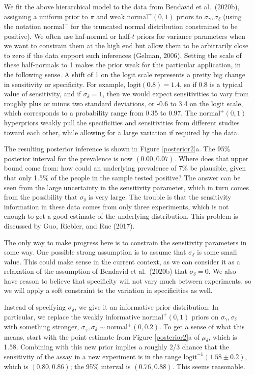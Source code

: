 \documentclass[11pt]{article}
\begin{document}
We fit the above hierarchical model to the data from Bendavid et al.\
(2020b), assigning a uniform prior to $\pi$ and weak
$\mbox{normal}^+(0,1)$ priors to $\sigma_{\gamma},\sigma_{\delta}$
(using the notation $\mbox{normal}^+$ for the truncated normal
distribution constrained to be positive).  We often use haf-normal or
half-$t$ priors for variance parameters when we want to constrain them
at the high end but allow them to be arbitrarily close to zero if the
data support such inferences (Gelman, 2006).  Setting the scale of
these half-normals to 1 makes the prior weak for this particular
application, in the following sense. A shift of 1 on the logit scale
represents a pretty big change in sensitivity or specificity.  For
example, $\mbox{logit}(0.8)=1.4$, so if 0.8 is a typical value of
sensitivity, and if $\sigma_{\delta}=1$, then we would expect
sensitivities to vary from roughly plus or minus two standard
deviations, or -0.6 to 3.4 on the logit scale,
which corresponds to a probability range from 0.35 to 0.97.  The
$\mbox{normal}^+(0,1)$ hyperpriors weakly pull the specificities and
sensitivities from different studies toward each other, while allowing
for a large variation if required by the data.

The resulting posterior inference is shown in Figure
\ref{posterior2}a.  The 95\% posterior interval for the prevalence is
now $(0.00, 0.07)$.  Where does that upper bound come from: how could
an underlying prevalence of 7\% be plausible, given that only 1.5\% of
the people in the sample tested positive?  The answer can be seen from
the large uncertainty in the sensitivity parameter, which in turn
comes from the possibility that $\sigma_{\delta}$ is very large.  The
trouble is that the sensitivity information in these data comes from
only three experiments, which is not enough to get a good estimate of
the underlying distribution.  This problem is discussed by Guo,
Riebler, and Rue (2017).

The only way to make progress here is to constrain the sensitivity
parameters in some way.  One possible strong assumption is to assume
that $\sigma_{\delta}$ is some small value.  This could make sense in
the current context, as we can consider it as a relaxation of the
assumption of Bendavid et al.\ (2020b) that $\sigma_{\delta} = 0$.  We
also have reason to believe that specificity will not vary much
between experiments, so we will apply a soft constraint to the
variation in specificities as well.

Instead of specifying $\sigma_{\delta}$, we give it an informative
prior distribution.  In particular, we replace the weakly informative
$\mbox{normal}^+(0, 1)$ priors on $\sigma_{\gamma},\sigma_{\delta}$
with something stronger,
$\sigma_{\gamma}, \sigma_{\delta}\sim\mbox{normal}^+(0, 0.2)$.  To get
a sense of what this means, start with the point estimate from Figure
\ref{posterior2}a of $\mu_{\delta}$, which is 1.58. Combining with
this new prior implies a roughly 2/3 chance that the sensitivity of
the assay in a new experiment is in the range
$\mbox{logit}^{-1}(1.58 \pm 0.2)$, which is $(0.80, 0.86)$; the 95\%
interval is $(0.76, 0.88)$. This seems reasonable.
\end{document}
